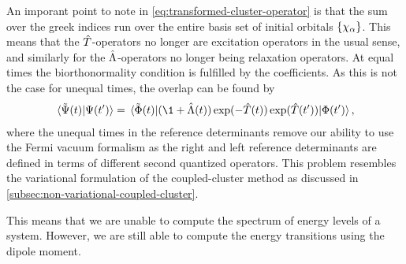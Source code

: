             An imporant point to note in
            \autoref{eq:transformed-cluster-operator}
            is that the sum over the greek indices run over the entire basis set
            of initial orbitals $\left\{ \chi_{\alpha} \right\}$.
            This means that the $\hat{T}$-operators no longer are excitation
            operators in the usual sense, and similarly for the
            $\hat{\Lambda}$-operators no longer being relaxation operators.
            At equal times the biorthonormality condition is fulfilled by the
            coefficients.
            As this is not the case for unequal times, the overlap can be found
            by
            \begin{align}
                \braket*{\tilde{\Psi}(t)}{\Psi(t')}
                =
                \mel*{\tilde{\slat}(t)}{
                    (
                        \1 + \clustl(t)
                    )
                    \exponential(-\clust(t))
                    \exponential(\clust(t'))
                }{\slat(t')},
            \end{align}
            where the unequal times in the reference determinants remove our
            ability to use the Fermi vacuum formalism as the right and left
            reference determinants are defined in terms of different second
            quantized operators.
            This problem resembles the variational formulation of the
            coupled-cluster method as discussed in
            \autoref{subsec:non-variational-coupled-cluster}.

            This means that we are unable to compute the spectrum of energy
            levels of a system.
            However, we are still able to compute the energy transitions using
            the dipole moment.

